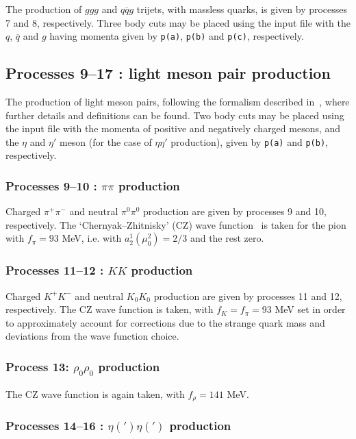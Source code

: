 \documentclass[12pt]{article}
\begin{document}
The production of $ggg$ and $q\overline{q}g$ trijets, with massless quarks, is given by processes 7 and 8, respectively. Three body cuts may be 
placed using the input file with the $q$, $\overline{q}$ and $g$ having momenta given by \texttt{p(a)}, \texttt{p(b)} and \texttt{p(c)}, respectively.

\subsection{Processes 9--17 : light meson pair production}

The production of light meson pairs, following the formalism described in~\cite{HarlandLang:2011qd,Harland-Lang:2013ncy}, where further details and 
definitions can be found. Two body cuts may be placed using the input file with the momenta of  positive and negatively charged mesons, and the 
$\eta$ and $\eta'$ meson (for the case of $\eta\eta'$ production), given by  \texttt{p(a)} and \texttt{p(b)}, respectively.

\subsubsection{Processes 9--10 : $\pi\pi$ production}

Charged $\pi^+\pi^-$ and neutral $\pi^0\pi^0$ production are given by processes 9 and 10, respectively. The `Chernyak--Zhitnisky' (CZ) wave 
function~\cite{Chernyak:1981zz} is taken for the pion with $f_\pi=93$ MeV, i.e. with $a_2^1(\mu_0^2)=2/3$ and the rest zero.

\subsubsection{Processes 11--12 : $KK$ production}

 Charged $K^+K^-$ and neutral $K_0K_0$ production are given by processes 11 and 12, respectively. The CZ wave function is taken, with 
 $f_K=f_\pi=93$ MeV set in order to approximately account for corrections due to the strange quark mass and deviations from the wave function choice.
 
 \subsubsection{Process 13: $\rho_0\rho_0$ production}
 
 The CZ wave function is again taken, with $f_\rho=141$ MeV.
 
 \subsubsection{Processes 14--16 : $\eta(')\eta(')$ production}
\end{document}
